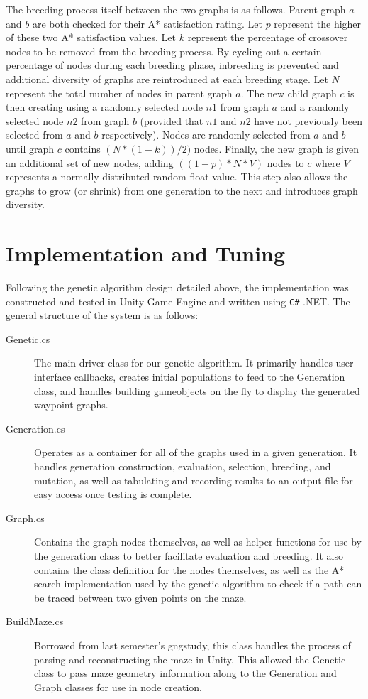 	The breeding process itself between the two graphs is as follows. Parent graph \(a\) and \(b\) are both checked for their A* satisfaction rating. Let \(p\) represent the higher of these two A* satisfaction values. Let \(k\) represent the percentage of crossover nodes to be removed from the breeding process. By cycling out a certain percentage of nodes during each breeding phase, inbreeding is prevented and additional diversity of graphs are reintroduced at each breeding stage. Let \(N\) represent the total number of nodes in parent graph \(a\). The new child graph \(c\) is then creating using a randomly selected node \(n1\) from graph \(a\) and a randomly selected node \(n2\) from graph \(b\) (provided that \(n1\) and \(n2\) have not previously been selected from \(a\) and \(b\) respectively). Nodes are randomly selected from \(a\) and \(b\) until graph \(c\) contains \((N*(1-k))/2)\) nodes. Finally, the new graph is given an additional set of new nodes, adding \(((1-p)*N * V)\) nodes to \(c\) where \(V\) represents a normally distributed random float value. This step also allows the graphs to grow (or shrink) from one generation to the next and introduces graph diversity.

\section{Implementation and Tuning}

	Following the genetic algorithm design detailed above, the implementation was constructed and tested in Unity Game Engine and written using \texttt{C\#} .NET. The general structure of the system is as follows:	
	\begin{description}
		\item[Genetic.cs] The main driver class for our genetic algorithm. It primarily handles user interface callbacks, creates initial populations to feed to the Generation class, and handles building gameobjects on the fly to display the generated waypoint graphs.
		\item[Generation.cs] Operates as a container for all of the graphs used in a given generation. It handles generation construction, evaluation, selection, breeding, and mutation, as well as tabulating and recording results to an output file for easy access once testing is complete.
		\item[Graph.cs] Contains the graph nodes themselves, as well as helper functions for use by the generation class to better facilitate evaluation and breeding. It also contains the class definition for the nodes themselves, as well as the A* search implementation used by the genetic algorithm to check if a path can be traced between two given points on the maze.
		\item[BuildMaze.cs] Borrowed from last semester's gngstudy, this class handles the process of parsing and reconstructing the maze in Unity. This allowed the Genetic class to pass maze geometry information along to the Generation and Graph classes for use in node creation.
	\end{description}
	
